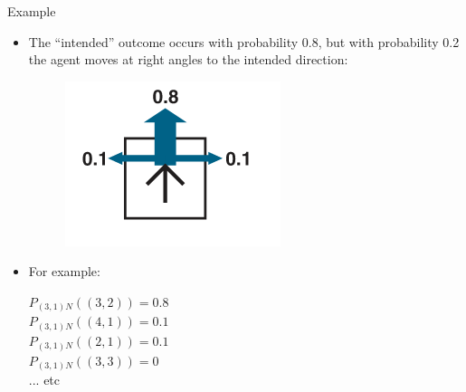 \documentclass[handout]{beamer}
\begin{document}
\begin{frame}{Example}
\scriptsize{
\begin{itemize}
\item The ``intended'' outcome occurs with probability 0.8, but with probability 0.2 the agent moves at right angles to the intended direction:

  \begin{figure}[h]
        	\includegraphics[scale = 0.4]{pics/example1.png}
        \end{figure}

\item For example:

 $P_{(3,1)N}((3,2))=0.8$ \\
 $P_{(3,1)N}((4,1))=0.1$ \\
 $P_{(3,1)N}((2,1))=0.1$ \\
 $P_{(3,1)N}((3,3))=0$ \\
... etc


\end{itemize}


} 

\end{frame}
\end{document}
